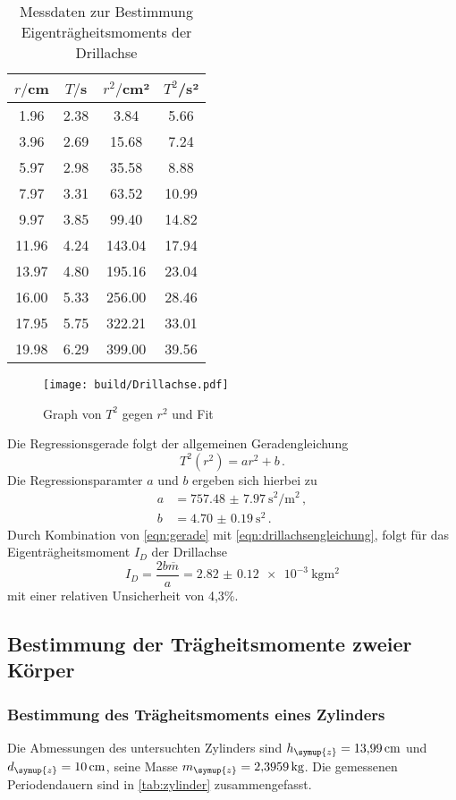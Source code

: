 \begin{table}
\centering
\caption{Messdaten zur Bestimmung Eigenträgheitsmoments der Drillachse}
\label{tab:drillachse}
\begin{tabular}{c c c c}
\toprule
$r/$cm & $T/$s & $r^2/$cm² & $T^2$/s² \\
\midrule
 1.96 & 2.38 &   3.84 &  5.66 \\
 3.96 & 2.69 &  15.68 &  7.24 \\
 5.97 & 2.98 &  35.58 &  8.88 \\
 7.97 & 3.31 &  63.52 & 10.99 \\
 9.97 & 3.85 &  99.40 & 14.82 \\
11.96 & 4.24 & 143.04 & 17.94 \\
13.97 & 4.80 & 195.16 & 23.04 \\
16.00 & 5.33 & 256.00 & 28.46 \\
17.95 & 5.75 & 322.21 & 33.01 \\
19.98 & 6.29 & 399.00 & 39.56 \\
\bottomrule
\end{tabular}
\end{table}
\begin{figure}
  \centering
  \texttt{[image: build/Drillachse.pdf]}
  \caption{Graph von $T^2$ gegen $r^2$ und Fit}
  \label{fig:drillachse}
\end{figure}
Die Regressionsgerade folgt der allgemeinen Geradengleichung
\begin{equation}
  T^2(r^2) = ar^2+b\,.
  \label{eqn:gerade}
\end{equation}
Die Regressionsparamter $a$ und $b$ ergeben sich hierbei zu
\begin{align}
  a &= \SI{757.48(797)}{\second\squared/\meter\squared}\,,\\
  b &= \SI{4.70(019)}{\second\squared}\,.
\end{align}
Durch Kombination von \eqref{eqn:gerade} mit \eqref{eqn:drillachsengleichung},
folgt für das Eigenträgheitsmoment $I_D$ der Drillachse
\begin{equation}
  I_D = \frac{2b\overline{m}}{a} = \SI{2.82(012)e-3}{\kilogram\meter\squared}
\end{equation}
mit einer relativen Unsicherheit von 4,3\%.
\subsection{Bestimmung der Trägheitsmomente zweier Körper}
\subsubsection{Bestimmung des Trägheitsmoments eines Zylinders}
Die Abmessungen des untersuchten Zylinders sind $h_{\symup{z}}=\SI{13.99}{\cm}$ und
$d_{\symup{z}}=\SI{10}{\cm}$, seine Masse $m_{\symup{z}}=\SI{2.3959}{\kilogram}$.
Die gemessenen Periodendauern sind in \ref{tab:zylinder} zusammengefasst.

